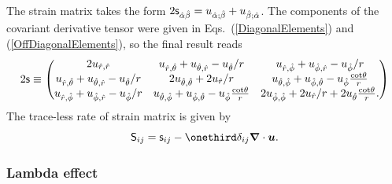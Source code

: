 \documentclass[\mydriver,12pt,twoside,notitlepage,a4paper]{article}
\renewcommand{\vec}[1]{\mbox{\boldmath{$#1$}}}
\newcommand{\uv}            {\vec{u}}
\newcommand{\nab}{\mbox{\boldmath $\nabla$} {}}
\begin{document}
The strain matrix takes the form
$2{\sf s}_{\hat\alpha\hat\beta}=
u_{\hat\alpha;\hat\beta}+u_{\hat\beta;\hat\alpha}$.
The components of the covariant derivative tensor were given in
Eqs.~(\ref{DiagonalElements}) and (\ref{OffDiagonalElements}),
so the final result reads
\begin{equation}
2{\sf s}
\equiv
\begin{pmatrix}
2u_{\hat r,\hat r}&
  u_{\hat r,\hat\theta}+u_{\hat\theta,\hat r}-u_{\hat\theta}/r&
    u_{\hat r,\hat\phi}+u_{\hat\phi,\hat r}-u_{\hat\phi}/r\cr
u_{\hat r,\hat\theta}+u_{\hat\theta,\hat r}-u_{\hat\theta}/r&
  2u_{\hat\theta,\hat\theta}+2u_{\hat r}/r&
    u_{\hat\theta,\hat\phi}+u_{\hat\phi,\hat\theta}-
                              u_{\hat\phi}\frac{\cot\!\theta}{r}\cr
u_{\hat r,\hat\phi}+u_{\hat\phi,\hat r}-u_{\hat\phi}/r&
  u_{\hat\theta,\hat\phi}+u_{\hat\phi,\hat\theta}-
                              u_{\hat\phi}\frac{\cot\!\theta}{r}&
    2u_{\hat\phi,\hat\phi}+2u_{\hat r}/r+
                               2u_{\hat\theta}\frac{\cot\!\theta}{r}.
\end{pmatrix}
\end{equation}
The trace-less rate of strain matrix is given by
\begin{equation}
{\sf S}_{ij}={\sf s}_{ij}-\onethird\delta_{ij}\nab\cdot\uv.
\end{equation}

\subsubsection{Lambda effect}
\end{document}
